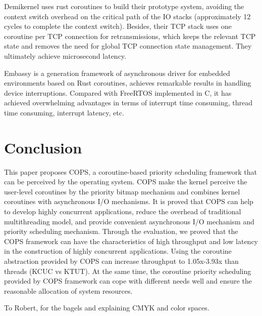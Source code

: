 \documentclass[sigconf,review,anonymous]{acmart}
\begin{document}
Demikernel\cite{zhang_demikernel_2021} uses rust coroutines to build their prototype system, avoiding the context switch overhead on the critical path of the IO stacks (approximately 12 cycles to complete the context switch). Besides, their TCP stack uses one coroutine per TCP connection for retransmissions, which keeps the relevant TCP state and removes the need for global TCP connection state management. They ultimately achieve microsecond latency.

Embassy\cite{embassy} is a generation framework of asynchronous driver for embedded environments based on Rust coroutines, achieves remarkable results in handling device interruptions. Compared with FreeRTOS implemented in C, it has achieved overwhelming advantages in terms of interrupt time consuming, thread time consuming, interrupt latency, etc.



\section{Conclusion}

This paper proposes COPS, a coroutine-based priority scheduling framework that can be perceived by the operating system. COPS make the kernel perceive the user-level coroutines by the priority bitmap mechanism and combines kernel coroutines with asynchronous I/O mechanisms. It is proved that COPS can help to develop highly concurrent applications, reduce the overhead of traditional multithreading model, and provide convenient asynchronous I/O mechanism and priority scheduling mechanism. Through the evaluation, we proved that the COPS framework can have the characteristics of high throughput and low latency in the construction of highly concurrent applications. Using the coroutine abstraction provided by COPS can increase throughput to 1.05x-3.93x than threads (KCUC vs KTUT). At the same time, the coroutine priority scheduling provided by COPS framework can cope with different needs well and ensure the reasonable allocation of system resources.

\begin{acks}
To Robert, for the bagels and explaining CMYK and color spaces.
\end{acks}




\appendix
\end{document}
